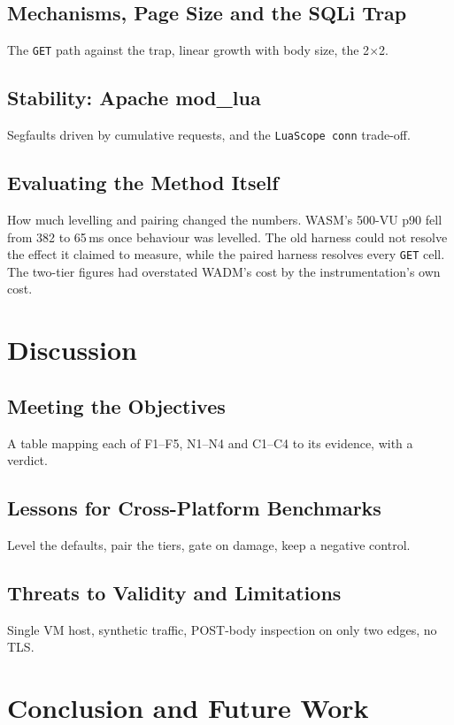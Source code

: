\documentclass{rptuma}
\begin{document}
\section{Mechanisms, Page Size and the SQLi Trap}
The \texttt{GET} path against the trap, linear growth with body size, the 2$\times$2.
\section{Stability: Apache mod\_lua}
Segfaults driven by cumulative requests, and the \texttt{LuaScope conn} trade-off.
\section{Evaluating the Method Itself}
How much levelling and pairing changed the numbers. WASM's 500-VU p90 fell from 382 to 65\,ms once
behaviour was levelled. The old harness could not resolve the effect it claimed to measure, while
the paired harness resolves every \texttt{GET} cell. The two-tier figures had overstated WADM's
cost by the instrumentation's own cost.

\chapter{Discussion}
\section{Meeting the Objectives}
A table mapping each of F1--F5, N1--N4 and C1--C4 to its evidence, with a verdict.
\section{Lessons for Cross-Platform Benchmarks}
Level the defaults, pair the tiers, gate on damage, keep a negative control.
\section{Threats to Validity and Limitations}
Single VM host, synthetic traffic, POST-body inspection on only two edges, no TLS.

\chapter{Conclusion and Future Work}
\end{document}
